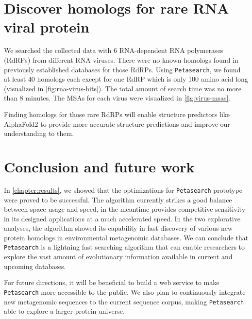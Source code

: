 \section{Discover homologs for rare RNA viral protein} \label{section:discover-homologs-for-rare-rna-virus-protein}

We searched the collected data with 6 RNA-dependent RNA polymerases (RdRPs) from different RNA viruses. There were no known homologs found in previously established databases for those RdRPs. Using \texttt{Petasearch}, we found at least 40 homologs each except for one RdRP which is only 100 amino acid long (visualized in \autoref{fig:rna-virus-hits}). The total amount of search time was no more than 8 minutes. The MSAs for each virus were visualized in \autoref{fig:virus-msas}.

Finding homologs for those rare RdRPs will enable structure predictors like AlphaFold2 to provide more accurate structure predictions and improve our understanding to them.

\section{Conclusion and future work} \label{section:conclusion-and-future-work}

In \cref{chapter:results}, we showed that the optimizations for \texttt{Petasearch} prototype were proved to be successful. The algorithm currently strikes a good balance between space usage and speed, in the meantime provides competitive sensitivity in its designed applications at a much accelerated speed. In the two explorative analyses, the algorithm showed its capability in fast discovery of various new protein homologs in environmental metagenomic databases. We can conclude that \texttt{Petasearch} is a lightning fast searching algorithm that can enable researchers to explore the vast amount of evolutionary information available in current and upcoming databases.

For future directions, it will be beneficial to build a web service to make \texttt{Petasearch} more accessible to the public. We also plan to continuously integrate new metagenomic sequences to the current sequence corpus, making \texttt{Petasearch} able to explore a larger protein universe.
